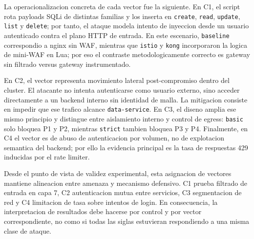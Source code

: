 La operacionalizacion concreta de cada vector fue la siguiente. En C1, el script rota payloads SQLi de distintas familias y los inserta en \texttt{create}, \texttt{read}, \texttt{update}, \texttt{list} y \texttt{delete}; por tanto, el ataque modela intento de inyeccion desde un usuario autenticado contra el plano HTTP de entrada. En este escenario, \texttt{baseline} correspondio a nginx sin WAF, mientras que \texttt{istio} y \texttt{kong} incorporaron la logica de mini-WAF en Lua; por eso el contraste metodologicamente correcto es gateway sin filtrado versus gateway instrumentado.

En C2, el vector representa movimiento lateral post-compromiso dentro del cluster. El atacante no intenta autenticarse como usuario externo, sino acceder directamente a un backend interno sin identidad de malla. La mitigacion consiste en impedir que ese trafico alcance \texttt{data-service}. En C3, el diseno amplia ese mismo principio y distingue entre aislamiento interno y control de egress: \texttt{basic} solo bloquea P1 y P2, mientras \texttt{strict} tambien bloquea P3 y P4. Finalmente, en C4 el vector es de abuso de autenticacion por volumen, no de explotacion semantica del backend; por ello la evidencia principal es la tasa de respuestas 429 inducidas por el rate limiter.

Desde el punto de vista de validez experimental, esta asignacion de vectores mantiene alineacion entre amenaza y mecanismo defensivo. C1 prueba filtrado de entrada en capa 7, C2 autenticacion mutua entre servicios, C3 segmentacion de red y C4 limitacion de tasa sobre intentos de login. En consecuencia, la interpretacion de resultados debe hacerse por control y por vector correspondiente, no como si todas las siglas estuvieran respondiendo a una misma clase de ataque.